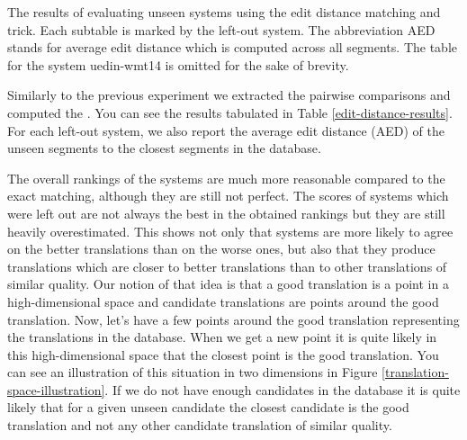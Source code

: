\begin{table}
\caption[Results of evaluating unseen systems by edit distance matching]{The results of
  evaluating unseen systems using the edit distance matching and
   trick. Each subtable is marked by the left-out system.
  The abbreviation AED stands for average edit distance which is computed
across all segments. The table for the system uedin-wmt14 is omitted for the sake
of brevity.}

  \label{edit-distance-results}
\end{table}

Similarly to the previous experiment we extracted the pairwise comparisons and
computed the . You can see the results
tabulated in Table \ref{edit-distance-results}. For each left-out system,
we also report the average edit distance (AED) of the unseen segments to the closest
segments in the database.

The overall rankings of the systems are much more reasonable compared to the
exact matching, although they are still not perfect. The scores of systems
which were left out are not always the best in the obtained rankings but they
are still heavily overestimated. This shows not only that systems are more
likely to agree on the better translations than on the worse ones, but also
that they produce translations which are closer to better translations than to
other translations of similar quality. Our notion of that idea is that a good
translation is a point  in a high-dimensional space and candidate translations
are points around the good translation. Now, let's have a few points around the
good translation representing the translations in the database. When we get a
new point it is quite likely in this high-dimensional space that the closest
point is the good translation. You can see an illustration of this situation in
two dimensions in Figure \ref{translation-space-illustration}.  If we do not have enough candidates in the
database it is quite likely that for a given unseen candidate the closest
candidate is the good translation and not any other candidate translation of
similar quality. 


